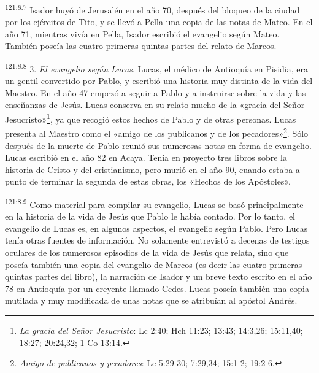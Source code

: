 \par
\textsuperscript{121:8.7} Isador huyó de Jerusalén en el año 70, después del bloqueo de la ciudad por los ejércitos de Tito, y se llevó a Pella una copia de las notas de Mateo. En el año 71, mientras vivía en Pella, Isador escribió el evangelio según Mateo. También poseía las cuatro primeras quintas partes del relato de Marcos.

\par
\textsuperscript{121:8.8} 3. \textit{El evangelio según Lucas}. Lucas, el médico de Antioquía en Pisidia, era un gentil convertido por Pablo, y escribió una historia muy distinta de la vida del Maestro. En el año 47 empezó a seguir a Pablo y a instruirse sobre la vida y las enseñanzas de Jesús. Lucas conserva en su relato mucho de la «gracia del Señor Jesucristo»\footnote{\textit{La gracia del Señor Jesucristo}: Lc 2:40; Hch 11:23; 13:43; 14:3,26; 15:11,40; 18:27; 20:24,32; 1 Co 13:14.}, ya que recogió estos hechos de Pablo y de otras personas. Lucas presenta al Maestro como el «amigo de los publicanos y de los pecadores»\footnote{\textit{Amigo de publicanos y pecadores}: Lc 5:29-30; 7:29,34; 15:1-2; 19:2-6.}. Sólo después de la muerte de Pablo reunió sus numerosas notas en forma de evangelio. Lucas escribió en el año 82 en Acaya. Tenía en proyecto tres libros sobre la historia de Cristo y del cristianismo, pero murió en el año 90, cuando estaba a punto de terminar la segunda de estas obras, los «Hechos de los Apóstoles».

\par
\textsuperscript{121:8.9} Como material para compilar su evangelio, Lucas se basó principalmente en la historia de la vida de Jesús que Pablo le había contado. Por lo tanto, el evangelio de Lucas es, en algunos aspectos, el evangelio según Pablo. Pero Lucas tenía otras fuentes de información. No solamente entrevistó a decenas de testigos oculares de los numerosos episodios de la vida de Jesús que relata, sino que poseía también una copia del evangelio de Marcos (es decir las cuatro primeras quintas partes del libro), la narración de Isador y un breve texto escrito en el año 78 en Antioquía por un creyente llamado Cedes. Lucas poseía también una copia mutilada y muy modificada de unas notas que se atribuían al apóstol Andrés.

